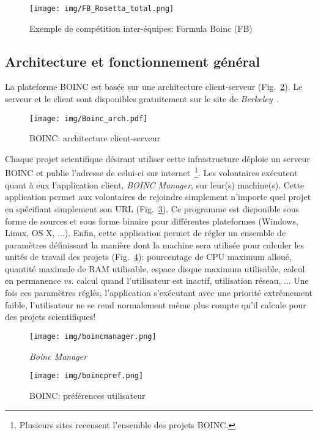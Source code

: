 \documentclass[a4paper, 12pt]{report}
\begin{document}
\begin{figure}[!b]
\centering
\texttt{[image: img/FB\_Rosetta\_total.png]}
\caption{Exemple de compétition inter-équipes: Formula Boinc (FB)~\cite{SEB}}
\label{fb}
\end{figure}

\subsection{Architecture et fonctionnement général}
La plateforme \textsc{BOINC} est basée sur une architecture client-serveur (Fig.~\ref{clientserveur}). Le serveur et le client sont disponibles gratuitement sur le site de \textit{Berkeley}~\cite{BOINC}.
\begin{figure}[!tb]
\centering
\texttt{[image: img/Boinc\_arch.pdf]}
\caption{\textsc{BOINC}: architecture client-serveur}
\label{clientserveur}
\end{figure}

Chaque projet scientifique désirant utiliser cette infrastructure déploie un serveur \textsc{BOINC} et publie l'adresse de celui-ci sur internet~\footnote{Plusieurs sites recensent l'ensemble des projets \textsc{BOINC}.}. %
Les volontaires exécutent quant à eux l'application client, \textit{BOINC Manager}, sur leur(s) machine(s). Cette application permet aux volontaires de rejoindre simplement n'importe quel projet en spécifiant simplement son URL (Fig.~\ref{boincmanager}). Ce programme est disponible sous forme de sources et sous forme binaire pour différentes plateformes (Windows, Linux, OS X, ...). Enfin, cette application permet de régler un ensemble de paramètres définissant la manière dont la machine sera utilisée pour calculer les unités de travail des projets (Fig.~\ref{boincpref}): pourcentage de CPU maximum alloué, quantité maximale de RAM utilisable, espace disque maximum utilisable, calcul en permanence \textit{vs.} calcul quand l'utilisateur est inactif, utilisation réseau, ... Une fois ces paramètres réglés, l'application s'exécutant avec une priorité extrêmement faible, l'utilisateur ne se rend normalement même plus compte qu'il calcule pour des projets scientifiques!

\begin{figure}[!b]
\centering
\texttt{[image: img/boincmanager.png]}
\caption{\textit{Boinc Manager}}
\label{boincmanager}
\end{figure}

\begin{figure}[!b]
\centering
\texttt{[image: img/boincpref.png]}
\caption{\textsc{BOINC}: préférences utilisateur}
\label{boincpref}
\end{figure}
\end{document}
